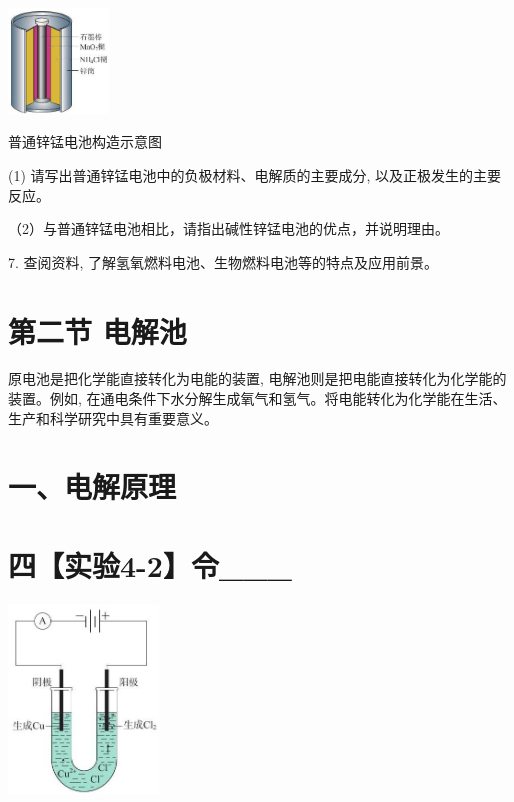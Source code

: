 \documentclass[10pt]{article}
\begin{document}
\begin{center}
\includegraphics[max width=0.2\textwidth]{images/0190da9d-8bfd-732f-bc2c-0b21d0f13b91_108_977880.jpg}
\end{center}

普通锌锰电池构造示意图

(1) 请写出普通锌锰电池中的负极材料、电解质的主要成分, 以及正极发生的主要反应。

（2）与普通锌锰电池相比，请指出碱性锌锰电池的优点，并说明理由。

7. 查阅资料, 了解氢氧燃料电池、生物燃料电池等的特点及应用前景。

\section*{第二节 电解池}

原电池是把化学能直接转化为电能的装置, 电解池则是把电能直接转化为化学能的装置。例如, 在通电条件下水分解生成氧气和氢气。将电能转化为化学能在生活、生产和科学研究中具有重要意义。

\section*{一、电解原理}

\section*{四【实验4-2】令\_\_\_}

\begin{center}
\includegraphics[max width=0.3\textwidth]{images/0190da9d-8bfd-732f-bc2c-0b21d0f13b91_109_113003.jpg}
\end{center}
\end{document}
